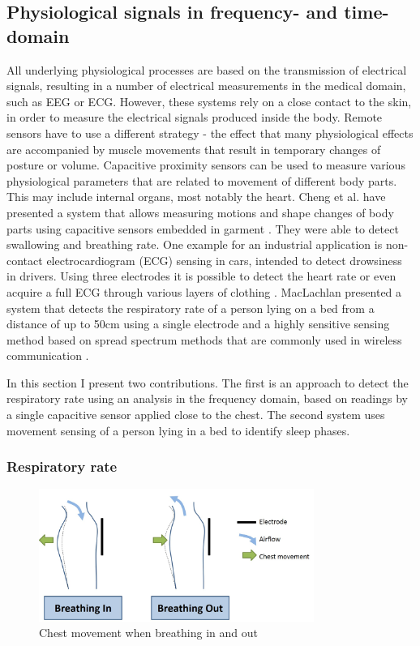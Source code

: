 \subsection{Physiological signals in frequency- and time-domain}
\label{ch:proc_physio}
All underlying physiological processes are based on the transmission of electrical signals, resulting in a number of electrical measurements in the medical domain, such as EEG or ECG. However, these systems rely on a close contact to the skin, in order to measure the electrical signals produced inside the body. Remote sensors have to use a different strategy - the effect that many physiological effects are accompanied by muscle movements that result in temporary changes of posture or volume. Capacitive proximity sensors can be used to measure various physiological parameters that are related to movement of different body parts. This may include internal organs, most notably the heart. Cheng et al. have presented a system that allows measuring motions and shape changes of body parts using capacitive sensors embedded in garment \cite{cheng2010active}. They were able to detect swallowing and breathing rate. One example for an industrial application is non-contact electrocardiogram (ECG) sensing in cars, intended to detect drowsiness in drivers. Using three electrodes it is possible to detect the heart rate or even acquire a full ECG through various layers of clothing \cite{plessey2012ecg}. MacLachlan presented a system that detects the respiratory rate of a person lying on a bed from a distance of up to 50cm using a single electrode and a highly sensitive sensing method based on spread spectrum methods that are commonly used in wireless communication \cite{MacLachlan2004}.

In this section I present two contributions. The first is an approach to detect the respiratory rate using an analysis in the frequency domain, based on readings by a single capacitive sensor applied close to the chest. The second system uses movement sensing of a person lying in a bed to identify sleep phases.

\subsubsection{Respiratory rate}
\begin{figure}[ht]
\centering
\includegraphics[width=0.8\textwidth]{images/breathing}
\caption{Chest movement when breathing in and out}
\label{fig:breathing}
\end{figure}

